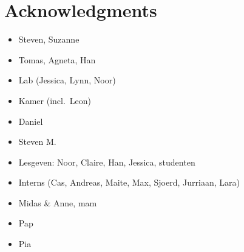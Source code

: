 \documentclass[11pt,american,]{memoir} %
\providecommand{\tightlist}{%
  \setlength{\itemsep}{0pt}\setlength{\parskip}{0pt}}
\begin{document}
\hypertarget{acknowledgments}{%
\chapter*{Acknowledgments}\label{acknowledgments}}


\begin{itemize}
\tightlist
\item
  Steven, Suzanne
\item
  Tomas, Agneta, Han
\item
  Lab (Jessica, Lynn, Noor)
\item
  Kamer (incl.~Leon)
\item
  Daniel
\item
  Steven M.
\item
  Lesgeven: Noor, Claire, Han, Jessica, studenten
\item
  Interns (Cas, Andreas, Maite, Max, Sjoerd, Jurriaan, Lara)
\item
  Midas \& Anne, mam
\item
  Pap
\item
  Pia
\end{itemize}

\backmatter
\end{document}
